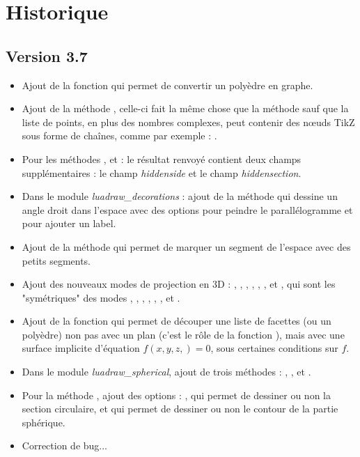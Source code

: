 \section{Historique}
\subsection{Version 3.7}
\begin{itemize}
    \item Ajout de la fonction  qui permet de convertir un polyèdre en graphe.
    
    \item Ajout de la méthode , celle-ci fait la même chose que la méthode  sauf que la liste de points, en plus des nombres complexes, peut contenir des nœuds TikZ sous forme de chaînes, comme par exemple : .
    
    \item Pour les méthodes ,  et  : le résultat renvoyé contient deux champs supplémentaires : le champ \emph{hiddenside} et le champ \emph{hiddensection}.
    
    \item Dans le module \emph{luadraw\_decorations} : ajout de la  méthode  qui dessine un angle droit dans l'espace avec des options pour peindre le parallélogramme et pour ajouter un label.
    
    \item Ajout de la méthode  qui permet de marquer un segment de l'espace avec des petits segments.
    
    \item Ajout des nouveaux modes de projection en 3D : , , , , , , et , qui sont les "symétriques" des modes , , , , , , et .
    
    \item Ajout de la fonction  qui permet de découper une liste de facettes (ou un polyèdre) non pas avec un plan (c'est le rôle de la fonction ), mais avec une surface implicite d'équation $f(x,y,z,)=0$, sous certaines conditions sur $f$.

    \item Dans le module \emph{luadraw\_spherical}, ajout de trois méthodes : , ,  et .
    
    \item Pour la méthode , ajout des options : , qui permet de dessiner ou non la section circulaire, et  qui permet de dessiner ou non le contour de la partie sphérique.
    
    \item Correction de bug...
\end{itemize}


